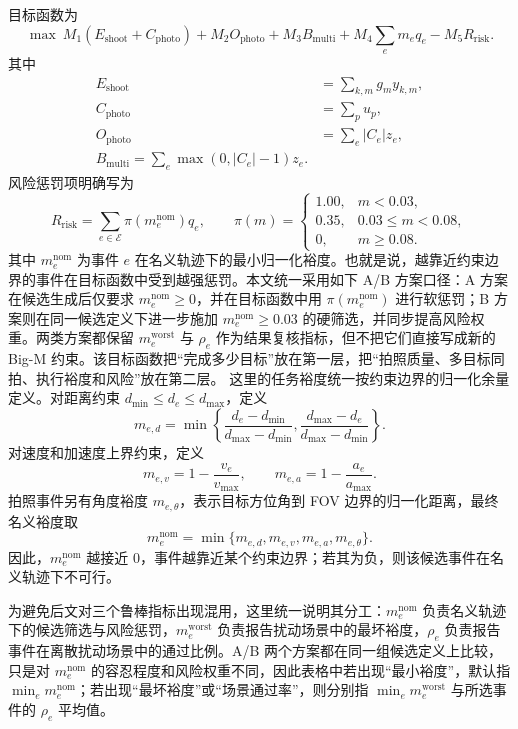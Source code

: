 \documentclass{cumcmthesis}
\begin{document}
目标函数为
\begin{equation}
 \max\ M_1(E_{\mathrm{shoot}}+C_{\mathrm{photo}})
 +M_2O_{\mathrm{photo}}+M_3B_{\mathrm{multi}}
 +M_4\sum_e m_eq_e-M_5R_{\mathrm{risk}}.
\end{equation}
其中
\begin{align}
  E_{\mathrm{shoot}}&=\sum_{k,m}g_my_{k,m},\\
  C_{\mathrm{photo}}&=\sum_pu_p,\\
  O_{\mathrm{photo}}&=\sum_e |C_e|z_e,\\
  B_{\mathrm{multi}}=\sum_e\max(0,|C_e|-1)z_e.
\end{align}
风险惩罚项明确写为
\[
  R_{\mathrm{risk}}=\sum_{e\in\mathcal E}\pi(m_e^{\mathrm{nom}})q_e,
  \qquad
  \pi(m)=
  \begin{cases}
    1.00, & m<0.03,\\
    0.35, & 0.03\le m<0.08,\\
    0, & m\ge 0.08.
  \end{cases}
\]
其中 $m_e^{\mathrm{nom}}$ 为事件 $e$ 在名义轨迹下的最小归一化裕度。也就是说，越靠近约束边界的事件在目标函数中受到越强惩罚。本文统一采用如下 A/B 方案口径：A 方案在候选生成后仅要求 $m_e^{\mathrm{nom}}\ge 0$，并在目标函数中用 $\pi(m_e^{\mathrm{nom}})$ 进行软惩罚；B 方案则在同一候选定义下进一步施加 $m_e^{\mathrm{nom}}\ge 0.03$ 的硬筛选，并同步提高风险权重。两类方案都保留 $m_e^{\mathrm{worst}}$ 与 $\rho_e$ 作为结果复核指标，但不把它们直接写成新的 Big-M 约束。该目标函数把“完成多少目标”放在第一层，把“拍照质量、多目标同拍、执行裕度和风险”放在第二层。
这里的任务裕度统一按约束边界的归一化余量定义。对距离约束 $d_{\min}\le d_e\le d_{\max}$，定义
\[
  m_{e,d}=\min\left\{\frac{d_e-d_{\min}}{d_{\max}-d_{\min}},
  \frac{d_{\max}-d_e}{d_{\max}-d_{\min}}\right\}.
\]
对速度和加速度上界约束，定义
\[
  m_{e,v}=1-\frac{v_e}{v_{\max}},\qquad
  m_{e,a}=1-\frac{a_e}{a_{\max}}.
\]
拍照事件另有角度裕度 $m_{e,\theta}$，表示目标方位角到 FOV 边界的归一化距离，最终名义裕度取
\[
  m_e^{\mathrm{nom}}=\min\{m_{e,d},m_{e,v},m_{e,a},m_{e,\theta}\}.
\]
因此，$m_e^{\mathrm{nom}}$ 越接近 0，事件越靠近某个约束边界；若其为负，则该候选事件在名义轨迹下不可行。

为避免后文对三个鲁棒指标出现混用，这里统一说明其分工：$m_e^{\mathrm{nom}}$ 负责名义轨迹下的候选筛选与风险惩罚，$m_e^{\mathrm{worst}}$ 负责报告扰动场景中的最坏裕度，$\rho_e$ 负责报告事件在离散扰动场景中的通过比例。A/B 两个方案都在同一组候选定义上比较，只是对 $m_e^{\mathrm{nom}}$ 的容忍程度和风险权重不同，因此表格中若出现“最小裕度”，默认指 $\min_e m_e^{\mathrm{nom}}$；若出现“最坏裕度”或“场景通过率”，则分别指 $\min_e m_e^{\mathrm{worst}}$ 与所选事件的 $\rho_e$ 平均值。
\end{document}
